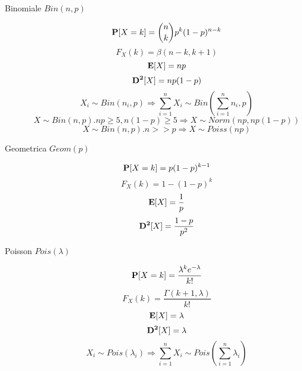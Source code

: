 \begin{description}
	\item[Binomiale $Bin(n,p)$]
		\begin{equation}
		\mathbf{P}[X=k]=\binom{n}{k}p^{k}(1-p)^{n-k}
		\end{equation}
		\begin{equation}
		F_{X}(k)=\beta(n-k,k+1)
		\end{equation}
		\begin{equation}
		\mathbf{E}[X]=np
		\end{equation}
		\begin{equation}
		\mathbf{D^{2}}[X]=np(1-p)
		\end{equation}
		\begin{equation}
		X_{i}\sim Bin(n_{i},p)\Rightarrow \sum_{i=1}^{n}X_{i} \sim Bin(\sum_{i=1}^{n}n_{i},p)
		\end{equation}
		\begin{equation}
		X\sim Bin(n,p).np\geq 5,n(1-p)\geq 5\Rightarrow X\sim Norm(np,np(1-p))
		\end{equation}
		\begin{equation}
		X\sim Bin(n,p).n>>p \Rightarrow X\sim Poiss(np)
		\end{equation}
	
	\item[Geometrica $Geom(p)$]
		\begin{equation}
		\mathbf{P}[X=k]=p(1-p)^{k-1}
		\end{equation}
		\begin{equation}
		F_{X}(k)=1-(1-p)^{k}
		\end{equation}
		\begin{equation}
		\mathbf{E}[X]=\frac{1}{p}
		\end{equation}
		\begin{equation}
		\mathbf{D^{2}}[X]=\frac{1-p}{p^{2}}
		\end{equation}
	
	\item[Poisson $Pois(\lambda)$]
		\begin{equation}
		\mathbf{P}[X=k]=\frac{\lambda^{k}e^{-\lambda}}{k!}
		\end{equation}
		\begin{equation}
		F_{X}(k)=\frac{\Gamma(k+1,\lambda)}{k!}
		\end{equation}
		\begin{equation}
		\mathbf{E}[X]=\lambda
		\end{equation}
		\begin{equation}
		\mathbf{D^{2}}[X]=\lambda
		\end{equation}
		\begin{equation}
		X_{i}\sim Pois(\lambda_{i}) \Rightarrow \sum_{i=1}^{n}X_{i}\sim Pois(\sum_{i=1}^{n}\lambda_{i})
		\end{equation}
	
\end{description}
\newpage

